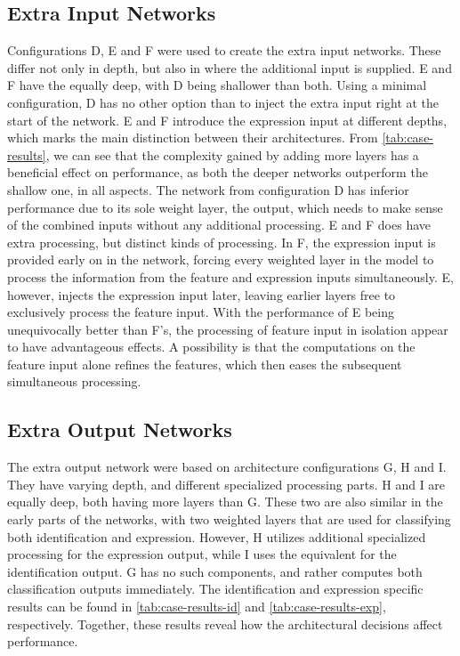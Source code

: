 \subsection{Extra Input Networks}

Configurations D, E and F were used to create the extra input networks. These differ not only in depth, but also in where the additional input is supplied. E and F have the equally deep, with D being shallower than both. Using a minimal configuration, D has no other option than to inject the extra input right at the start of the network. E and F introduce the expression input at different depths, which marks the main distinction between their architectures. From \autoref{tab:case-results}, we can see that the complexity gained by adding more layers has a beneficial effect on performance, as both the deeper networks outperform the shallow one, in all aspects. The network from configuration D has inferior performance due to its sole weight layer, the output, which needs to make sense of the combined inputs without any additional processing. E and F does have extra processing, but distinct kinds of processing. In F, the expression input is provided early on in the network, forcing every weighted layer in the model to process the information from the feature and expression inputs simultaneously. E, however, injects the expression input later, leaving earlier layers free to exclusively process the feature input. With the performance of E being unequivocally better than F's, the processing of feature input in isolation appear to have advantageous effects. A possibility is that the computations on the feature input alone refines the features, which then eases the subsequent simultaneous processing. 

\subsection{Extra Output Networks}

The extra output network were based on architecture configurations G, H and I. They have varying depth, and different specialized processing parts. H and I are equally deep, both having more layers than G. These two are also similar in the early parts of the networks, with two weighted layers that are used for classifying both identification and expression. However, H utilizes additional specialized processing for the expression output, while I uses the equivalent for the identification output. G has no such components, and rather computes both classification outputs immediately. The identification and expression specific results can be found in \autoref{tab:case-results-id} and \autoref{tab:case-results-exp}, respectively. Together, these results reveal how the architectural decisions affect performance. \\

